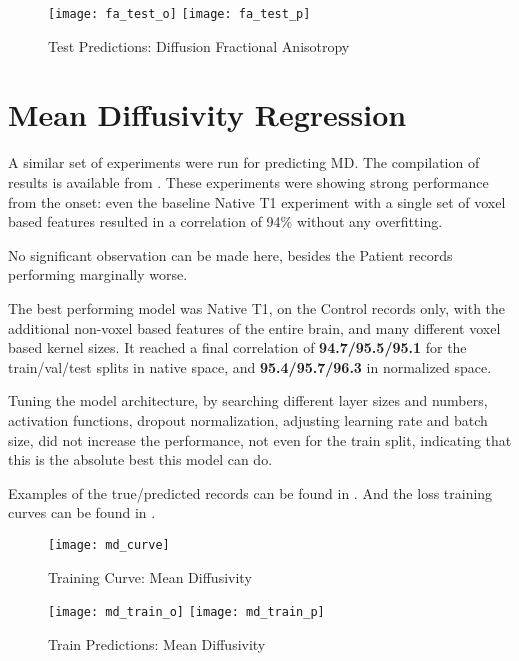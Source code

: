 \begin{figure}[H]
\centering
\texttt{[image: fa\_test\_o]}
\texttt{[image: fa\_test\_p]}
\caption{Test Predictions: Diffusion Fractional Anisotropy}
\label{fig:pred-tes-fa}
\end{figure}

\section{Mean Diffusivity Regression}

A similar set of experiments were run for predicting \ac{MD}. The compilation of results is available from  . These experiments were showing strong performance from the onset: even the baseline Native T1 experiment with a single set of voxel based features resulted in a correlation of 94\% without any overfitting.\par
No significant observation can be made here, besides the Patient records performing marginally worse.\par
The best performing model was Native T1, on the Control records only, with the additional non-voxel based features of the entire brain, and many different voxel based kernel sizes. It reached a final correlation of \textbf{94.7/95.5/95.1} for the train/val/test splits in native space, and \textbf{95.4/95.7/96.3} in normalized space.\par
Tuning the model architecture, by searching different layer sizes and numbers, activation functions, dropout normalization, adjusting learning rate and batch size, did not increase the performance, not even for the train split, indicating that this is the absolute best this model can do.\par
Examples of the true/predicted records can be found in  . And the loss training curves can be found in .

\begin{figure}[H]
\centering
\texttt{[image: md\_curve]}
\caption{Training Curve: Mean Diffusivity}
\label{fig:curve-md}
\end{figure}

\begin{figure}[H]
\centering
\texttt{[image: md\_train\_o]}
\texttt{[image: md\_train\_p]}
\caption{Train Predictions: Mean Diffusivity}
\label{fig:pred-tra-md}
\end{figure}

